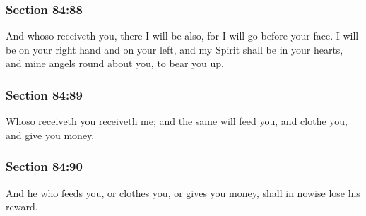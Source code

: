 	\subsubsection{Section 84:88} %
		\label{DC84-88}

		And whoso receiveth you, there I will be also, for I will go before your face.  I will be on your right hand and on your left, and my Spirit shall be in your hearts, and mine angels round about you, to bear you up.


	\subsubsection{Section 84:89} %
		\label{DC84-89}

		Whoso receiveth you receiveth me; and the same will feed you, and clothe you, and give you money.


	\subsubsection{Section 84:90} %
		\label{DC84-90}

		And he who feeds you, or clothes you, or gives you money, shall in nowise lose his reward.


